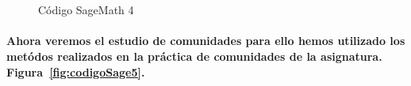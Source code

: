 \documentclass[11pt,spanish]{article}
\begin{document}
\begin{figure}[H]
	\begin{center}
%
	   \\%
	   \\ %
%
	\end{center}
	\caption{%
	Código SageMath 4
 	}%
	\label{fig:codigoSage4}
\end{figure}

\paragraph*{Ahora veremos el estudio de comunidades para ello hemos utilizado los metódos realizados en la práctica de comunidades de la asignatura. Figura~\ref{fig:codigoSage5}.}
\end{document}
